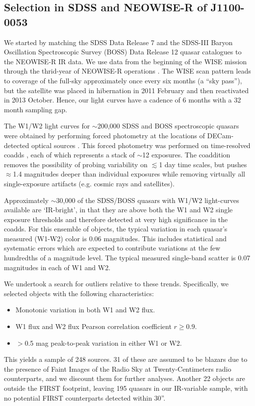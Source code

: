 \documentclass[a4paper,fleqn,usenatbib]{mnras}
\begin{document}
\subsection{Selection in SDSS and NEOWISE-R of J1100-0053}
We started by matching the SDSS Data Release 7 \cite[DR7Q;
][]{Schneider2007} and the SDSS-III Baryon Oscillation Spectroscopic
Survey (BOSS) Data Release 12 quasar catalogues \cite[DR12Q;
][]{Paris2017} to the NEOWISE-R IR data. We use data from the
beginning of the WISE mission \citep[2010 January; ][]{Wright2010}
through the thrid-year of NEOWISE-R operations \citep[2016 December;
][]{Mainzer2011}. The WISE scan pattern leads to coverage of the
full-sky approximately once every six months (a ``sky pass''), but the
satellite was placed in hibernation in 2011 February and then
reactivated in 2013 October. Hence, our light curves have a cadence of
6 months with a 32 month sampling gap.

The W1/W2 light curves for $\sim$200,000 SDSS and BOSS spectroscopic
quasars were obtained by performing forced photometry at the locations
of DECam-detected optical sources \citep{Lang2014, Meisner2017a,
Meisner2017b}. This forced photometry was performed on time-resolved
coadds \citep{Lang2014}, each of which represents a stack of $\sim$12
exposures. The coaddition removes the possibility of probing
variability on $\lesssim$1 day time scales, but pushes $\approx$1.4
magnitudes deeper than individual exposures while removing virtually
all single-exposure artifacts (e.g. cosmic rays and satellites).

Approximately $\sim$30,000 of the SDSS/BOSS quasars with W1/W2
light-curves available are `IR-bright', in that they are above both
the W1 and W2 single exposure thresholds and therefore detected at
very high significance in the coadds. For this ensemble of objects,
the typical variation in each quasar's measured (W1-W2) color is 0.06
magnitudes.  This includes statistical and systematic errors which are
expected to contribute variations at the few hundredths of a magnitude
level. The typical measured single-band scatter is 0.07 magnitudes in
each of W1 and W2.

We undertook a search for outliers relative to these
trends. Specifically, we selected objects with the following
characteristics:
\begin{itemize}
  \item Monotonic variation in both W1 and W2 flux.
  \item W1 flux and W2 flux Pearson correlation coefficient $r \geq0.9$.
  \item $>$0.5 mag peak-to-peak variation in either W1 or W2.
\end{itemize}
This yields a sample of 248 sources. 31 of these are assumed to be
blazars due to the presence of Faint Images of the Radio Sky at
Twenty-Centimeters \citep[FIRST; ][]{Becker1995} radio counterparts,
and we discount them for further analyses. Another 22 objects are
outside the FIRST footprint, leaving 195 quasars in our IR-variable
sample, with no potential FIRST counterparts detected within 30''. 
\end{document}
